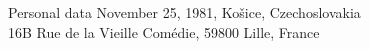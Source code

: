\documentclass{resume}
\begin{document}
\maketitle




\begin{category}{Personal data}
 November 25, 1981, Ko\v sice, Czechoslovakia\\
\vspace{-1em}
 16B Rue de la Vieille Com\' edie, 59800 Lille, France\\
\end{category}
\end{document}
